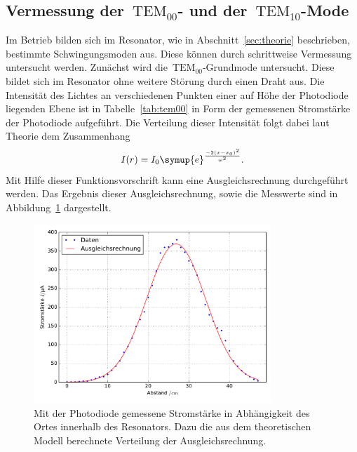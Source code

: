 \subsection{Vermessung der~$\text{TEM}_{00}$- und der~$\text{TEM}_{10}$-Mode}
%
Im Betrieb bilden sich im Resonator, wie in Abschnitt~\ref{sec:theorie} beschrieben, bestimmte Schwingungsmoden aus. Diese können durch
schrittweise Vermessung untersucht werden. Zunächst wird die~$\text{TEM}_{00}$-Grundmode untersucht. Diese bildet sich im Resonator ohne weitere
Störung durch einen Draht aus. Die Intensität des Lichtes an verschiedenen Punkten einer auf Höhe der Photodiode liegenden Ebene ist in
Tabelle~\ref{tab:tem00} in Form der gemessenen Stromstärke der Photodiode aufgeführt. Die Verteilung dieser Intensität folgt dabei laut Theorie
dem Zusammenhang
%
\begin{equation}
  I(r)=I_0\symup{e}^{\frac{-2(x-x_0)^2}{\omega^2}}.
\end{equation}
%
Mit Hilfe dieser Funktionsvorschrift kann eine Ausgleichsrechnung durchgeführt werden. Das Ergebnis dieser Ausgleichsrechnung, sowie die Messwerte sind in Abbildung~\ref{fig:tem00} dargestellt.
%
\begin{figure}[h]
  \centering
  \includegraphics[width=0.8\textwidth]{auswertung/plot_Mode00.pdf}
  \caption{Mit der Photodiode gemessene Stromstärke in Abhängigkeit des Ortes innerhalb des Resonators. Dazu die aus dem theoretischen Modell berechnete Verteilung der Ausgleichsrechnung.}
  \label{fig:tem00}
\end{figure}
%
